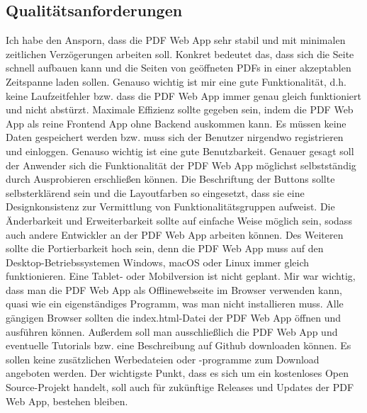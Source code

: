 \subsection{Qualitätsanforderungen}
Ich habe den Ansporn, dass die PDF Web App sehr stabil und mit minimalen zeitlichen Verzögerungen arbeiten soll. Konkret bedeutet das, dass sich die Seite schnell aufbauen kann und die Seiten von geöffneten PDFs in einer akzeptablen Zeitspanne laden sollen. Genauso wichtig ist mir eine gute Funktionalität, d.h. keine Laufzeitfehler bzw. dass die PDF Web App immer genau gleich funktioniert und nicht abstürzt. Maximale Effizienz sollte gegeben sein, indem die PDF Web App als reine Frontend App ohne Backend auskommen kann. Es müssen keine Daten gespeichert werden bzw. muss sich der Benutzer nirgendwo registrieren und einloggen. Genauso wichtig ist eine gute Benutzbarkeit. Genauer gesagt soll der Anwender sich die Funktionalität der PDF Web App möglichst selbstständig durch Ausprobieren erschließen können. Die Beschriftung der Buttons sollte selbsterklärend sein und die Layoutfarben so eingesetzt, dass sie eine Designkonsistenz zur Vermittlung von Funktionalitätsgruppen aufweist. Die Änderbarkeit und Erweiterbarkeit sollte auf einfache Weise möglich sein, sodass auch andere Entwickler an der PDF Web App arbeiten können. Des Weiteren sollte die Portierbarkeit hoch sein, denn die PDF Web App muss auf den Desktop-Betriebssystemen Windows, macOS oder Linux immer gleich funktionieren. Eine Tablet- oder Mobilversion ist nicht geplant. Mir war wichtig, dass man die PDF Web App als Offlinewebseite im Browser verwenden kann, quasi wie ein eigenständiges Programm, was man nicht installieren muss. Alle gängigen Browser sollten die index.html-Datei der PDF Web App öffnen und ausführen können. Außerdem soll man ausschließlich die PDF Web App und eventuelle Tutorials bzw. eine Beschreibung auf Github downloaden können. Es sollen keine zusätzlichen Werbedateien oder -programme zum Download angeboten werden. Der wichtigste Punkt, dass es sich um ein kostenloses Open Source-Projekt handelt, soll auch für zukünftige Releases und Updates der PDF Web App, bestehen bleiben. 